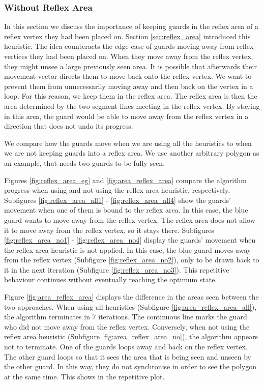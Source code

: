 \subsubsection{Without Reflex Area}
In this section we  discuss the importance of keeping guards in the reflex area of a reflex vertex they had been placed on. Section \ref{sec:reflex_area} introduced this heuristic. The idea counteracts the edge-case of guards moving away from reflex vertices they had been placed on. When they move away from the reflex vertex, they might unsee a large previously seen area. It is possible that afterwards their movement vector directs them to move back onto the reflex vertex. We want to prevent them from unnecessarily moving away and then back on the vertex in a loop. For this reason, we  keep them in the reflex area. The reflex area is then the area determined by the two segment lines meeting in the reflex vertex. By staying in this area, the guard would be able to move away from the reflex vertex in a direction that does not undo its progress.

We  compare how the guards move when we are using all the heuristics to when we are not keeping guards into a reflex area. We  use another arbitrary polygon as an example, that needs two guards to be fully seen.

Figures \ref{fig:reflex_area_eg} and \ref{fig:area_reflex_area} compare the algorithm progress when using and not using the reflex area heuristic, respectively. Subfigures \ref{fig:reflex_area_all1} - \ref{fig:reflex_area_all4} show the guards' movement when one of them is bound to the reflex area. In this case, the blue guard wants to move away from the reflex vertex. The reflex area does not allow it to move away from the reflex vertex, so it stays there. 
Subfigures \ref{fig:reflex_area_no1} - \ref{fig:reflex_area_no4} display the guards' movement when the reflex area heuristic is not applied. In this case, the blue guard moves away from the reflex vertex (Subfigure \ref{fig:reflex_area_no2}), only to be drawn back to it in the next iteration (Subfigure \ref{fig:reflex_area_no3}). This repetitive behaviour continues without eventually reaching the optimum state.

Figure \ref{fig:area_reflex_area} displays the difference in the areas seen between the two approaches. When using all heuristics (Subfigure \ref{fig:area_reflex_area_all}), the algorithm terminates in 7 iterations. The continuous line marks the guard who did not move away from the reflex vertex. Conversely, when not using the reflex area heuristic (Subfigure \ref{fig:area_reflex_area_no}), the algorithm appears not to terminate. One of the guards loops away and back on the reflex vertex. The other guard loops so that it sees the area that is being seen and unseen by the other guard. In this way, they do not synchronise in order to see the polygon at the same time. This shows in the repetitive plot.

